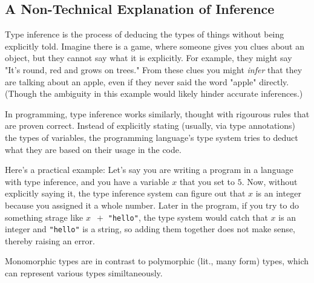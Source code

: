 \documentclass{l4proj}
\begin{document}
\subsection{A Non-Technical Explanation of Inference}

Type inference is the process of deducing the types of things without being explicitly told.
Imagine there is a game, where someone gives you clues about an object, but they cannot say what it is explicitly.
For example, they might say "It's round, red and grows on trees."
From these clues you might \emph{infer} that they are talking about an apple, even if they never said the word "apple" directly. 
(Though the ambiguity in this example would likely hinder accurate inferences.)

In programming, type inference works similarly, thought with rigourous rules that are proven correct.
Instead of explicitly stating (usually, via type annotations) the types of variables, the programming language's type system tries to deduct what they are based on their usage in the code.


Here's a practical example: Let's say you are writing a program in a language with type inference, and you have a variable $x$ that you set to $5$.
Now, without explicitly saying it, the type inference system can figure out that $x$ is an integer because you assigned it a whole number.
Later in the program, if you try to do something strage like $x \;\: +$ \texttt{"hello"}, the type system would catch that $x$ is an integer and \texttt{"hello"} is a string, so adding them together does not make sense, thereby raising an error.




Monomorphic types are in contrast to polymorphic (lit., many form) types, which can represent various types similtaneously.






\end{document}
